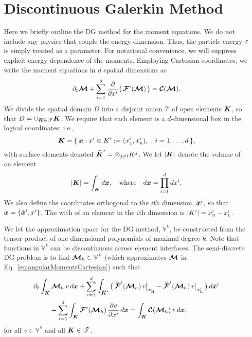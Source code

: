 \section{Discontinuous Galerkin Method}
\label{sec:dg}

Here we briefly outline the DG method for the moment equations.  
We do not include any physics that couple the energy dimension.  
Thus, the particle energy $\varepsilon$ is simply treated as a parameter.  
For notational convenience, we will suppress explicit energy dependence of the moments.  
Employing Cartesian coordinates, we write the moment equations in $d$ spatial dimensions as
\begin{equation}
  \partial_{t}{\boldsymbol{\mathcal{M}}}+\sum_{i=1}^{d}\frac{\partial }{\partial x^{i}}\big(\,\boldsymbol{\mathcal{F}}^{i}(\boldsymbol{\mathcal{M}})\,\big)=\boldsymbol{\mathcal{C}}(\boldsymbol{\mathcal{M}}).  
  \label{eq:angularMomentsCartesian}
\end{equation}
We divide the spatial domain $D$ into a disjoint union $\mathscr{T}$ of open elements $\boldsymbol{K}$, so that $D = \cup_{\boldsymbol{K} \in \mathscr{T}}\boldsymbol{K}$.  
We require that each element is a $d$-dimensional box in the logical coordinates; i.e.,
\begin{equation}
  \boldsymbol{K}=\{\,\boldsymbol{x} : x^{i} \in K^{i} := (x_{\mbox{\tiny L}}^{i},x_{\mbox{\tiny H}}^{i}),~|~i=1,\ldots,d\,\}, 
\end{equation}
with surface elements denoted $\tilde{\boldsymbol{K}}^{i}=\otimes_{j\ne i}K^{j}$.  
We let $|\boldsymbol{K}|$ denote the volume of an element
\begin{equation}
  |\boldsymbol{K}| = \int_{\boldsymbol{K}}d\boldsymbol{x}, \quad\text{where}\quad d\boldsymbol{x} = \prod_{i=1}^{d}dx^{i}.  
\end{equation}
We also define the coordinates orthogonal to the $i$th dimension, $\tilde{\boldsymbol{x}}^{i}$, so that $\boldsymbol{x}=\{\tilde{\boldsymbol{x}}^{i},x^{i}\}$.  
The with of an element in the $i$th dimension is $|K^{i}|=x_{\mbox{\tiny H}}^{i}-x_{\mbox{\tiny L}}^{i}$.  

We let the approximation space for the DG method, $\mathbb{V}^{k}$, be constructed from the tensor product of one-dimensional polynomials of maximal degree $k$.  
Note that functions in $\mathbb{V}^{k}$ can be discontinuous across element interfaces.  
The semi-discrete DG problem is to find $\boldsymbol{\mathcal{M}}_{h}\in\mathbb{V}^{k}$ (which approximates $\boldsymbol{\mathcal{M}}$ in Eq.~\eqref{eq:angularMomentsCartesian}) such that
\begin{align}
  &\partial_{t}{}\int_{\boldsymbol{K}}\boldsymbol{\mathcal{M}}_{h}\,v\,d\boldsymbol{x}
  +\sum_{i=1}^{d}\int_{\tilde{\boldsymbol{K}}^{i}}
  \big(\,
    \widehat{\boldsymbol{\mathcal{F}}}^{i}(\boldsymbol{\mathcal{M}}_{h})\,v\big|_{x_{\mbox{\tiny H}}^{i}}
    -\widehat{\boldsymbol{\mathcal{F}}}^{i}(\boldsymbol{\mathcal{M}}_{h})\,v\big|_{x_{\mbox{\tiny L}}^{i}}
  \,\big)\,d\tilde{\boldsymbol{x}}^{i} \nonumber \\
  &\hspace{24pt}
  -\sum_{i=1}^{d}\int_{\boldsymbol{K}}\boldsymbol{\mathcal{F}}^{i}(\boldsymbol{\mathcal{M}}_{h})\,\frac{\partial v}{\partial x^{i}}\,d\boldsymbol{x}
  =\int_{\boldsymbol{K}}\boldsymbol{\mathcal{C}}(\boldsymbol{\mathcal{M}}_{h})\,v\,d\boldsymbol{x},
  \label{eq:semidiscreteDG}
\end{align}
for all $v\in\mathbb{V}^{k}$ and all $\boldsymbol{K}\in\mathscr{T}$.  

